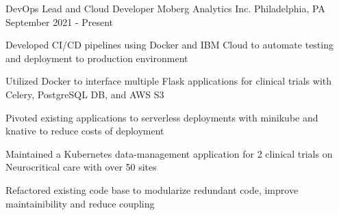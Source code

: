 

\begin{cventries}

  
	\cventry
	{DevOps Lead and Cloud Developer}
	{Moberg Analytics Inc.}
	{Philadelphia, PA}
	{September 2021 - Present}
	{\begin{cvitems}
		\item {Developed CI/CD pipelines using Docker and IBM Cloud to automate testing and deployment to production environment}
		\item {Utilized Docker to interface multiple Flask applications for clinical trials with Celery, PostgreSQL DB, and AWS S3}
		\item {Pivoted existing applications to serverless deployments with minikube and knative to reduce costs of deployment}
		\item {Maintained a Kubernetes data-management application for 2 clinical trials on Neurocritical care with over 50 sites}
		\item {Refactored existing code base to modularize redundant code, improve maintainibility and reduce coupling}
		\end{cvitems}}
	


\end{cventries}
